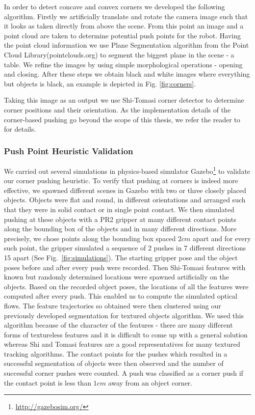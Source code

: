In order to detect concave and convex corners we developed the following algorithm. Firstly we artificially translate and rotate the camera image such that it looks as taken directly from above the scene. From this point an image and a point cloud are taken to determine potential push points for the robot. Having the point cloud information we use Plane Segmentation algorithm from the Point Cloud Library(pointclouds.org) to segment the biggest plane in the scene - a table. We refine the images by using simple morphological operations - opening and closing. After these steps we obtain black and white images where everything but objects is black, an example is depicted in Fig. \ref{fig:corners}. 

Taking this image as an output we use Shi-Tomasi corner detector to determine corner positions and their orientation. As the implementation details of the corner-based pushing go beyond the scope of this thesis, we refer the reader to~\cite{bersch12interactive} for details.

\subsubsection{Push Point Heuristic Validation}
We carried  out several simulations  in physics-based simulator Gazebo\footnote{\url{http://gazebosim.org/}} to validate  our corner
pushing heuristic. To verify that  pushing at corners is  indeed more
effective, we  spawned different  scenes in Gazebo  with two  or three
closely  placed objects. Objects were flat and round, in different orientations 
and arranged such that they were in solid contact or in single point contact.
We  then simulated  pushing at  these objects
with a PR2 gripper at many different contact points along the bounding
box of the  objects and in many different  directions. More precisely,
we chose points along the bounding box spaced $2cm$ apart and for every
such  point,  the  gripper simulated  a  sequence  of  2 pushes  in  7
different directions {15\textdegree}  apart (See Fig.~\ref{fig:simulations}). The starting gripper pose
and the object  poses before and after every  push were recorded. Then
Shi-Tomasi features with known but randomly determined  locations were spawned artificially on
the objects. Based on the  recorded object poses, the locations of all
the  features were  computed  after  every push.  This  enabled us  to
compute the simulated optical flows. The feature trajectories  so obtained were
then clustered using our previously developed segmentation for textured objects algorithm.
We used this algorithm because of the character of the features - there are many different forms of textureless features and it is difficult to come up with a general solution whereas Shi and Tomasi features are a good representatives for many textured tracking algorithms.  The contact points for the
pushes  which resulted in  a successful  segmentation of  objects were
then  observed  and  the  number  of  successful  corner  pushes  were
counted. A push  was classified as a corner push  if the contact point
is less than $1cm$ away from an object corner.

